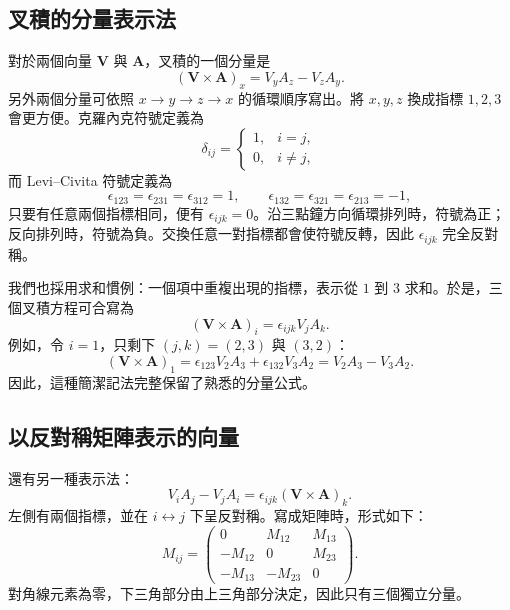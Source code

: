 \subsection{叉積的分量表示法}

對於兩個向量 \(\mathbf V\) 與 \(\mathbf A\)，叉積的一個分量是
\begin{equation}
  (\mathbf V\times\mathbf A)_x
  =
  V_yA_z-V_zA_y.
\end{equation}
另外兩個分量可依照 \(x\to y\to z\to x\) 的循環順序寫出。將 \(x,y,z\) 換成指標 \(1,2,3\) 會更方便。克羅內克符號定義為
\begin{equation}
  \delta_{ij}
  =
  \begin{cases}
    1,&i=j,\\
    0,&i\ne j,
  \end{cases}
\end{equation}
而 Levi--Civita 符號定義為
\begin{equation}
  \epsilon_{123}=\epsilon_{231}=\epsilon_{312}=1,
  \qquad
  \epsilon_{132}=\epsilon_{321}=\epsilon_{213}=-1,
\end{equation}
只要有任意兩個指標相同，便有 \(\epsilon_{ijk}=0\)。沿三點鐘方向循環排列時，符號為正；反向排列時，符號為負。交換任意一對指標都會使符號反轉，因此 \(\epsilon_{ijk}\) 完全反對稱。

我們也採用求和慣例：一個項中重複出現的指標，表示從 \(1\) 到 \(3\) 求和。於是，三個叉積方程可合寫為
\begin{equation}
  (\mathbf V\times\mathbf A)_i
  =
  \epsilon_{ijk}V_jA_k.
\end{equation}
例如，令 \(i=1\)，只剩下 \((j,k)=(2,3)\) 與 \((3,2)\)：
\begin{equation}
  (\mathbf V\times\mathbf A)_1
  =
  \epsilon_{123}V_2A_3
  +\epsilon_{132}V_3A_2
  =
  V_2A_3-V_3A_2.
\end{equation}
因此，這種簡潔記法完整保留了熟悉的分量公式。

\subsection{以反對稱矩陣表示的向量}

還有另一種表示法：
\begin{equation}
  V_iA_j-V_jA_i
  =
  \epsilon_{ijk}(\mathbf V\times\mathbf A)_k.
\end{equation}
左側有兩個指標，並在 \(i\leftrightarrow j\) 下呈反對稱。寫成矩陣時，形式如下：
\begin{equation}
  M_{ij}
  =
  \begin{pmatrix}
    0&M_{12}&M_{13}\\
    -M_{12}&0&M_{23}\\
    -M_{13}&-M_{23}&0
  \end{pmatrix}.
\end{equation}
對角線元素為零，下三角部分由上三角部分決定，因此只有三個獨立分量。

